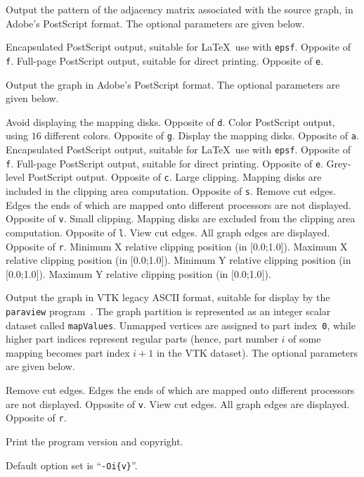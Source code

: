 \begin{itemize}
\begin{itemize}
\begin{itemize}
\iteme[\texttt{m}]
Output the pattern of the adjacency matrix associated with the source graph,
in Adobe's PostScript format. The optional parameters are given below.
\begin{itemize}
\iteme[\texttt{e}]
Encapsulated PostScript output, suitable for \LaTeX\ use with \texttt{epsf}.
Opposite of \texttt{f}.
\iteme[\texttt{f}]
Full-page PostScript output, suitable for direct printing.
Opposite of \texttt{e}.
\end{itemize}
\iteme[\texttt{p}]
Output the graph in Adobe's PostScript format.
The optional parameters are given below.
\begin{itemize}
\iteme[\texttt{a}]
Avoid displaying the mapping disks. Opposite of \texttt{d}.
\iteme[\texttt{c}]
Color PostScript output, using $16$ different colors. Opposite of \texttt{g}.
\iteme[\texttt{d}]
Display the mapping disks. Opposite of \texttt{a}.
\iteme[\texttt{e}]
Encapsulated PostScript output, suitable for \LaTeX\ use with \texttt{epsf}.
Opposite of \texttt{f}.
\iteme[\texttt{f}]
Full-page PostScript output, suitable for direct printing.
Opposite of \texttt{e}.
\iteme[\texttt{g}]
Grey-level PostScript output. Opposite of \texttt{c}.
\iteme[\texttt{l}]
Large clipping. Mapping disks are included in the clipping area computation.
Opposite of \texttt{s}.
\iteme[\texttt{r}]
Remove cut edges. Edges the ends of which are mapped onto different
processors are not displayed.
Opposite of \texttt{v}.
\iteme[\texttt{s}]
Small clipping. Mapping disks are excluded from the clipping area computation.
Opposite of \texttt{l}.
\iteme[\texttt{v}]
View cut edges. All graph edges are displayed.
Opposite of \texttt{r}.
\iteme[\texttt{x=}{\it val}]
Minimum X relative clipping position (in [0.0;1.0]).
\iteme[\texttt{X=}{\it val}]
Maximum X relative clipping position (in [0.0;1.0]).
\iteme[\texttt{y=}{\it val}]
Minimum Y relative clipping position (in [0.0;1.0]).
\iteme[\texttt{Y=}{\it val}]
Maximum Y relative clipping position (in [0.0;1.0]).
\end{itemize}
\iteme[\texttt{v}]
Output the graph in VTK legacy ASCII format, suitable for display by
the \texttt{paraview} program~\cite{paraview}. The graph partition is
represented as an integer scalar dataset called \texttt{mapValues}.
Unmapped vertices are assigned to part index~\texttt{0}, while higher
part indices represent regular parts (hence, part number $i$ of some
mapping becomes part index $i+1$ in the VTK dataset).
The optional parameters are given below.
\begin{itemize}
\iteme[\texttt{r}]
Remove cut edges. Edges the ends of which are mapped onto different
processors are not displayed. Opposite of \texttt{v}.
\iteme[\texttt{v}]
View cut edges. All graph edges are displayed.
Opposite of \texttt{r}.
\end{itemize}
\end{itemize}
\iteme[\texttt{-V}]
Print the program version and copyright.
\end{itemize}

Default option set is ``\texttt{-Oi\{v\}}''.
\end{itemize}

